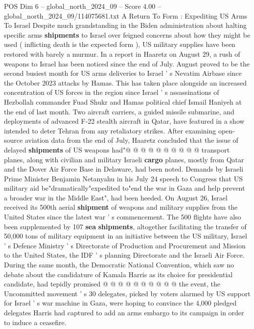 \begin{textsample}{POS Dim 6 – global\_north\_2024\_09 – Score 4.00 – global\_north\_2024\_09/114075681.txt}  \label{ex:f6_pos_367}
A Return To Form : Expediting US Arms To Israel Despite much grandstanding in the Biden administration about halting specific arms \textbf{shipments} to Israel over feigned concerns about how they might be used ( inflicting death is the expected form ), US military supplies have been restored with barely a murmur.
In a report in Haaretz on August 29, a rush of weapons to Israel has been noticed since the end of July.
August proved to be the second busiest month for US arms deliveries to Israel ' s Nevatim Airbase since the October 2023 attacks by Hamas.
This has taken place alongside an increased concentration of US forces in the region since Israel ' s assassinations of Hezbollah commander Fuad Shukr and Hamas political chief Ismail Haniyeh at the end of last month.
Two aircraft carriers, a guided missile submarine, and deployments of advanced F-22 stealth aircraft in Qatar, have featured in a show intended to deter Tehran from any retaliatory strikes.
After examining open-source aviation data from the end of July, Haaretz concluded that the issue of delayed \textbf{shipments} of US weapons had"@ @ @ @ @ @ @ @ @ @ transport planes, along with civilian and military Israeli \textbf{cargo} planes, mostly from Qatar and the Dover Air Force Base in Delaware, had been noted.
Demands by Israeli Prime Minister Benjamin Netanyahu in his July 24 speech to Congress that US military aid be"dramatically"expedited to"end the war in Gaza and help prevent a broader war in the Middle East", had been heeded.
On August 26, Israel received its 500th aerial \textbf{shipment} of weapons and military supplies from the United States since the latest war ' s commencement.
The 500 flights have also been supplemented by 107 \textbf{sea} \textbf{shipments}, altogether facilitating the transfer of 50,000 tons of military equipment in an initiative between the US military, Israel ' s Defence Ministry ' s Directorate of Production and Procurement and Mission to the United States, the IDF ' s planning Directorate and the Israeli Air Force.
During the same month, the Democratic National Convention, which saw no debate about the candidature of Kamala Harris as its choice for presidential candidate, had tepidly promised @ @ @ @ @ @ @ @ @ @ the event, the Uncommitted movement ' s 30 delegates, picked by voters alarmed by US support for Israel ' s war machine in Gaza, were hoping to convince the 4,000 pledged delegates Harris had captured to add an arms embargo to its campaign in order to induce a ceasefire.

\end{textsample}
